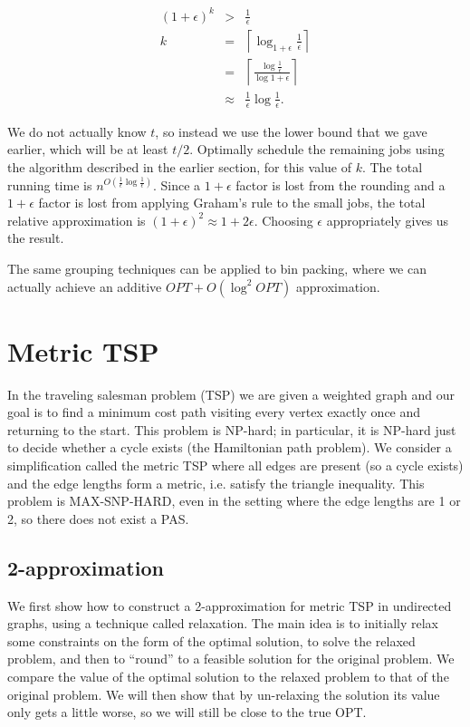 \documentclass{article}
\begin{document}
\begin{eqnarray*}
(1+\epsilon)^k & > & \frac{1}{\epsilon} \\
             k & = & \left \lceil \log_{1+\epsilon}{\frac{1}{\epsilon}} \right \rceil \\
               & = & \left \lceil \frac{\log{\frac{1}{\epsilon}}}{\log{1+\epsilon}} \right \rceil \\
               & \approx & \frac{1}{\epsilon} \log{\frac{1}{\epsilon}}.
\end{eqnarray*}

We do not actually know $t$, so instead we use the lower bound that we
gave earlier, which will be at least $t/2$.  Optimally schedule the
remaining jobs using the algorithm described in the earlier section,
for this value of $k$. The total running time is
$n^{O(\frac{1}{\epsilon} \log{\frac{1}{\epsilon}})}$. Since a
$1+\epsilon$ factor is lost from the rounding and a $1+\epsilon$
factor is lost from applying Graham's rule to the small jobs, the
total relative approximation is $(1+\epsilon)^2 \approx
1+2\epsilon$. Choosing $\epsilon$ appropriately gives us the result.

The same grouping techniques can be applied to bin packing, where we
can actually achieve an additive $OPT+O(\log^2 OPT)$ approximation.

\section{Metric TSP}

In the traveling salesman problem (TSP) we are given a weighted graph
and our goal is to find a minimum cost path visiting every vertex
exactly once and returning to the start. This problem is NP-hard; in
particular, it is NP-hard just to decide whether a cycle exists (the
Hamiltonian path problem). We consider a simplification called the
metric TSP where all edges are present (so a cycle exists) and the
edge lengths form a metric, i.e. satisfy the triangle inequality. 
This problem is MAX-SNP-HARD, even in the setting where the edge
lengths are 1 or 2, so there does not exist a PAS.

\subsection{2-approximation}

We first show how to construct a 2-approximation for metric TSP in
undirected graphs, using a technique called relaxation. The main idea
is to initially relax some constraints on the form of the optimal
solution, to solve the relaxed problem, and then to ``round'' to a
feasible solution for the original problem. We compare the value of
the optimal solution to the relaxed problem to that of the original
problem. We will then show that by un-relaxing the solution its value
only gets a little worse, so we will still be close to the true OPT.
\end{document}
